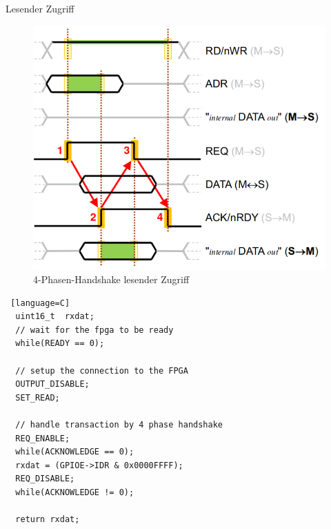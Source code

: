   \begin{frame} {Lesender Zugriff}
    \begin{figure}[ht]
      \centering
      \includegraphics[height=0.7\textheight]{figs/lesen_phase.png}
      \caption{4-Phasen-Handshake lesender Zugriff}
    \end{figure}
  \end{frame}


  \begin{frame} [fragile]
    \begin{lstlisting} [language=C]
  uint16_t  rxdat;
  // wait for the fpga to be ready
  while(READY == 0);

  // setup the connection to the FPGA
  OUTPUT_DISABLE;
  SET_READ;

  // handle transaction by 4 phase handshake
  REQ_ENABLE;
  while(ACKNOWLEDGE == 0);
  rxdat = (GPIOE->IDR & 0x0000FFFF);
  REQ_DISABLE;
  while(ACKNOWLEDGE != 0);

  return rxdat;
    \end{lstlisting}
  \end{frame}

